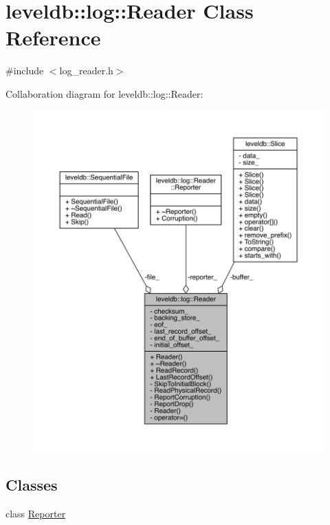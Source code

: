 \hypertarget{classleveldb_1_1log_1_1_reader}{}\section{leveldb\+:\+:log\+:\+:Reader Class Reference}
\label{classleveldb_1_1log_1_1_reader}


{\ttfamily \#include $<$log\+\_\+reader.\+h$>$}



Collaboration diagram for leveldb\+:\+:log\+:\+:Reader\+:\nopagebreak
\begin{figure}[H]
\begin{center}
\leavevmode
\includegraphics[width=350pt]{classleveldb_1_1log_1_1_reader__coll__graph}
\end{center}
\end{figure}
\subsection*{Classes}
\begin{DoxyCompactItemize}
\item 
class \hyperlink{classleveldb_1_1log_1_1_reader_1_1_reporter}{Reporter}
\end{DoxyCompactItemize}
